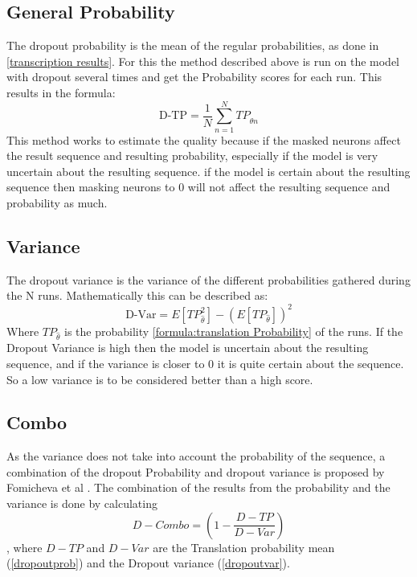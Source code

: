 \subsection{General Probability}
\label{dropoutprob}
The dropout probability is the mean of the regular probabilities, as done in \autoref{transcription results}. 
For this the method described above is run on the model with dropout several times and get the Probability scores for each run. 
This results in the formula:
$$\text{D-TP}=\frac{1}{N}\sum_{n=1}^N TP_{\hat\theta n}\label{formula:dropoutprobability}$$
This method works to estimate the quality because if the masked neurons affect the result sequence and resulting probability, especially if the model is very uncertain about the resulting sequence. if the model is certain about the resulting sequence then masking neurons to 0 will not affect the resulting sequence and probability as much. 

\subsection{Variance}
\label{dropoutvar}
The dropout variance is the variance of the different probabilities gathered during the N runs. 
Mathematically this can be described as:
$$\text{D-Var}=E[TP_{\hat\theta}^2]-(E[TP_{\hat\theta}])^2\label{formula:dropoutvariance}$$
Where $TP_{\hat\theta}$ is the probability \autoref{formula:translation Probability} of the runs. 
If the Dropout Variance is high then the model is uncertain about the resulting sequence, and if the variance is closer to 0 it is quite certain about the sequence.
So a low variance is to be considered better than a high score.

\subsection{Combo}
As the variance does not take into account the probability of the sequence, a combination of the dropout Probability and dropout variance is proposed by Fomicheva et al \cite{fomicheva2020unsupervised}. 
The combination of the results from the probability and the variance is done by calculating $$D-Combo=(1-\frac{D-TP}{D-Var})\label{formula:Dropoutcombo}$$, where $D-TP$ and $D-Var$ are the Translation probability mean (\autoref{dropoutprob}) and the Dropout variance (\autoref{dropoutvar}).

